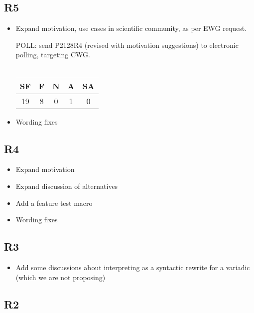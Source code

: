 \documentclass{wg21}
\begin{document}
\subsection{R5}
\begin{itemize}
\item Expand motivation, use cases in scientific community,
as per EWG request.


\begin{quoteblock}
POLL: send P2128R4 (revised with motivation suggestions) to electronic polling, targeting CWG.
\\\\
  
\begin{tabular}{|c|c|c|c|c|}
    \hline
    SF & F & N & A & SA \\
    \hline
    19 & 8 & 0 & 1 & 0 \\
    \hline
\end{tabular}

\end{quoteblock}

\item Wording fixes
\end{itemize}

\subsection{R4}

\begin{itemize}
\item Expand motivation
\item Expand discussion of alternatives
\item Add a feature test macro
\item Wording fixes
\end{itemize}

\subsection{R3}

\begin{itemize}
\item Add some discussions about interpreting  as a syntactic rewrite for a variadic  (which we are not proposing)
\end{itemize}

\subsection{R2}
\end{document}
